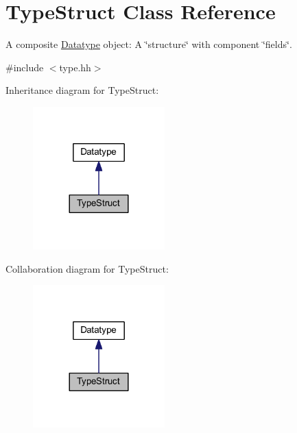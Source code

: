 \hypertarget{class_type_struct}{}\section{Type\+Struct Class Reference}
\label{class_type_struct}


A composite \mbox{\hyperlink{class_datatype}{Datatype}} object\+: A \char`\"{}structure\char`\"{} with component \char`\"{}fields\char`\"{}.  




{\ttfamily \#include $<$type.\+hh$>$}



Inheritance diagram for Type\+Struct\+:
\nopagebreak
\begin{figure}[H]
\begin{center}
\leavevmode
\includegraphics[width=144pt]{class_type_struct__inherit__graph}
\end{center}
\end{figure}


Collaboration diagram for Type\+Struct\+:
\nopagebreak
\begin{figure}[H]
\begin{center}
\leavevmode
\includegraphics[width=144pt]{class_type_struct__coll__graph}
\end{center}
\end{figure}
